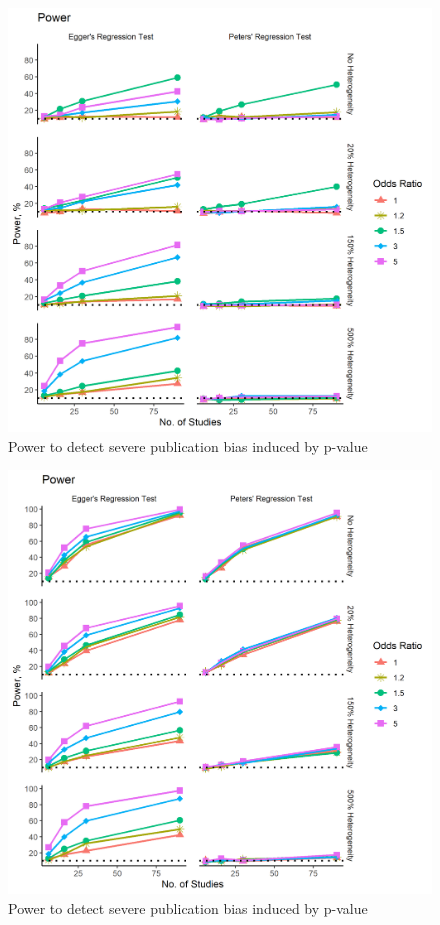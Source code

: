 \documentclass[
  english,
  doc,floatsintext,draftall]{apa6}
\begin{document}
\begin{figure}
\includegraphics[width=400pt]{../figures/power_p_moderate} \caption{Power to detect severe publication bias induced by p-value}\label{fig:unnamed-chunk-5}
\end{figure}

\begin{figure}
\includegraphics[width=400pt]{../figures/power_es_severe} \caption{Power to detect severe publication bias induced by p-value}\label{fig:unnamed-chunk-6}
\end{figure}
\end{document}
